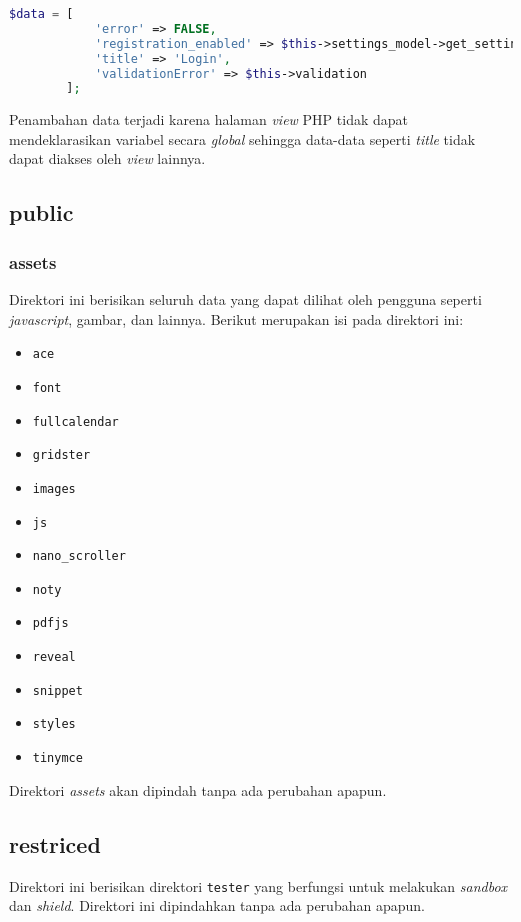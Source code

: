 \begin{lstlisting}[language=PHP, caption=Penambahan kode pada \textit{controller} \texttt{Login.php}, label=kode:loginControllerViewBab4]
	$data = [
			'error' => FALSE,
			'registration_enabled' => $this->settings_model->get_setting('enable_registration'),
			'title' => 'Login',
			'validationError' => $this->validation
		];
\end{lstlisting}

Penambahan data terjadi karena halaman \textit{view} PHP tidak dapat mendeklarasikan variabel secara \textit{global} sehingga data-data seperti \textit{title} tidak dapat diakses oleh \textit{view} lainnya.

\subsection{public}
	\subsubsection{assets}
	Direktori ini berisikan seluruh data yang dapat dilihat oleh pengguna seperti \textit{javascript}, gambar, dan lainnya. Berikut merupakan isi pada direktori ini:
	\begin{itemize}
		\item \texttt{ace}
		\item \texttt{font}
		\item \texttt{fullcalendar}
		\item \texttt{gridster}
		\item \texttt{images}
		\item \texttt{js}
		\item \texttt{nano\_scroller}
		\item \texttt{noty}
		\item \texttt{pdfjs}
		\item \texttt{reveal}
		\item \texttt{snippet}
		\item \texttt{styles}
		\item \texttt{tinymce}
	\end{itemize}
Direktori \textit{assets} akan dipindah tanpa ada perubahan apapun.

\subsection{restriced}
Direktori ini berisikan direktori \texttt{tester} yang berfungsi untuk melakukan \textit{sandbox} dan \textit{shield}. Direktori ini dipindahkan tanpa ada perubahan apapun.